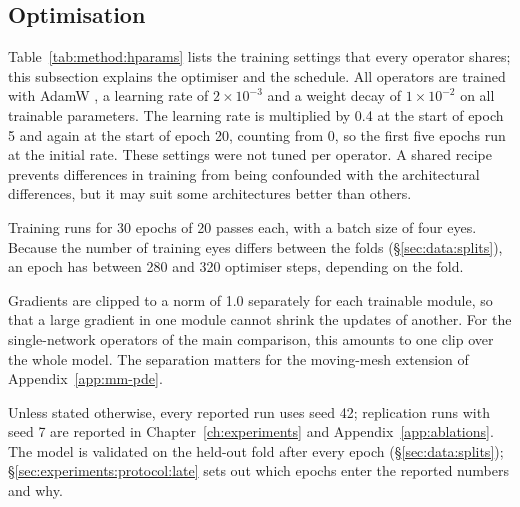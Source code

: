 \subsection{Optimisation}
\label{sec:method:training:optim}

Table~\ref{tab:method:hparams} lists the training settings that every
operator shares; this subsection explains the optimiser and the
schedule. All operators are trained with AdamW \citep{Loshchilov2019}, a
learning rate of $2 \times 10^{-3}$ and a weight decay of
$1 \times 10^{-2}$ on all trainable parameters. The learning rate is
multiplied by 0.4 at the start of epoch 5 and again at the start of epoch
20, counting from 0, so the first five epochs run at the initial rate.
These settings were not tuned per operator. A shared recipe prevents
differences in training from being confounded with the architectural
differences, but it may suit some architectures better than others.

Training runs for 30 epochs of 20 passes each, with a batch size of four
eyes. Because the number of training eyes differs between the folds
(\S\ref{sec:data:splits}), an epoch has between 280 and 320 optimiser
steps, depending on the fold.

Gradients are clipped to a norm of 1.0 separately for each trainable
module, so that a large gradient in one module cannot shrink the updates of
another. For the
single-network operators of the main comparison, this amounts to one clip
over the whole model. The separation matters for the moving-mesh extension
of Appendix~\ref{app:mm-pde}.

Unless stated otherwise, every reported run uses seed 42; replication runs
with seed 7 are reported in Chapter~\ref{ch:experiments} and
Appendix~\ref{app:ablations}. The model is validated on the held-out
fold after every epoch (\S\ref{sec:data:splits});
\S\ref{sec:experiments:protocol:late} sets out which epochs enter the
reported numbers and why.


